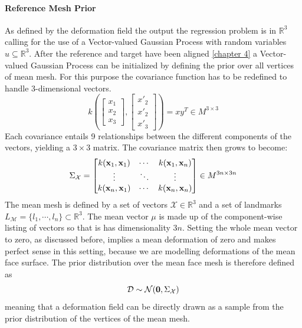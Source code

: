 \paragraph{Reference Mesh Prior}
As defined by the deformation field the output the regression problem is in $\mathbb{R}^3$ calling for the use of a Vector-valued Gaussian Process with random variables $u \subseteq \mathbb{R}^3$. 
After the reference and target have been aligned \ref{chapter 4} a Vector-valued Gaussian Process can be initialized by defining the prior over all vertices of mean mesh. For this purpose the covariance function has to be redefined to handle 3-dimensional vectors.
\begin{equation}
    k\left(
    \begin{bmatrix}x_{1}\\x_{2}\\x_{3}\end{bmatrix},
    \begin{bmatrix}x'_{2}\\x'_{2}\\x'_{3}\end{bmatrix}
    \right) = x y^T \in M^{3 \times 3}
\end{equation}
Each covariance entails 9 relationships between the different components of the vectors, yielding a $3 \times 3$ matrix. The covariance matrix then grows to become: 
\begin{equation}
    \Sigma_{\mathcal{X}} = 
\begin{bmatrix}
    k(\textbf{x}_{1},\textbf{x}_{1}) & \cdots & k(\textbf{x}_{1},\textbf{x}_{n}) \\
\vdots & \ddots & \vdots \\
k(\textbf{x}_{n},\textbf{x}_{1}) & \cdots & k(\textbf{x}_{n},\textbf{x}_{n})
\end{bmatrix} \in M^{3n \times 3n}
\end{equation}
The mean mesh is defined by a set of vectors $\mathcal{X} \in \mathbb{R}^3$ and a set of landmarks $L_\mathcal{M}=\{l_{1}, \cdots, l_{n}\} \subset \mathbb{R}^3$.
The mean vector $\mu$ is made up of the component-wise listing of vectors so that is has dimensionality $3n$. Setting the whole mean vector to zero, as discussed before, implies a mean deformation of zero and makes perfect sense in this setting, because we are modelling deformations of the mean face surface. 
The prior distribution over the mean face mesh is therefore defined as 
\begin{equation}
    \mathcal{D} \sim \mathcal{N}(\textbf{0}, \Sigma_{\mathcal{X}})
\end{equation}
meaning that a deformation field can be directly drawn as a sample from the prior distribution of the vertices of the mean mesh. 

